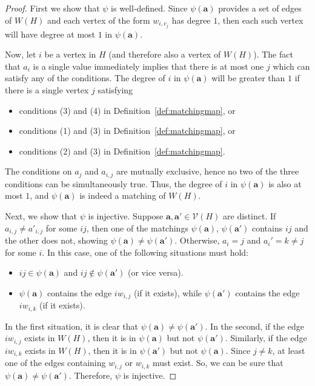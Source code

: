 \documentclass[12pt]{amsart}
\theoremstyle{definition}
\newcommand\ba{\mathbf{a}}
\newcommand\calV{\mathcal{V}}
\begin{document}
\begin{proof}
    First we show that $\psi$ is well-defined.
    Since $\psi(\ba)$ provides a set of edges of $W(H)$ and each vertex of the form $w_{i,v_j}$ has degree $1$, then each such vertex will have degree at most $1$ in $\psi(\ba)$.
    
    Now, let $i$ be a vertex in $H$ (and therefore also a vertex of $W(H)$).
    The fact that $a_i$ is a single value immediately implies that there is at most one $j$ which can satisfy any of the conditions.
    The degree of $i$ in $\psi(\ba)$ will be greater than $1$ if there is a single vertex $j$ satisfying
    \begin{itemize}
        \item conditions (3) and (4) in Definition~\ref{def:matchingmap}, or
        \item conditions (1) and (3) in Definition~\ref{def:matchingmap}, or
        \item conditions (2) and (3) in Definition~\ref{def:matchingmap}.
    \end{itemize}
    The conditions on $a_j$ and $a_{i,j}$ are mutually exclusive, hence no two of the three conditions can be simultaneously true.
    Thus, the degree of $i$ in $\psi(\ba)$ is also at most $1$, and $\psi(\ba)$ is indeed a matching of $W(H)$.

    Next, we show that $\psi$ is injective.
    Suppose $\ba, \ba' \in \calV(H)$ are distinct.
    If $a_{i,j} \neq a'_{i,j}$ for some $ij$, then one of the matchings $\psi(\ba)$, $\psi(\ba')$ contains $ij$ and the other does not, showing $\psi(\ba) \neq \psi(\ba')$.
    Otherwise, $a_i = j$ and $a_i' = k \neq j$ for some $i$.
    In this case, one of the following situations must hold:
    \begin{itemize}
        \item $ij \in \psi(\ba)$ and $ij \notin \psi(\ba')$ (or vice versa).
        \item $\psi(\ba)$ contains the edge $iw_{i,j}$ (if it exists), while $\psi(\ba')$ contains the edge  $iw_{i,k}$ (if it exists).
    \end{itemize}
    In the first situation, it is clear that $\psi(\ba) \neq \psi(\ba')$.
    In the second, if the edge $iw_{i,j}$ exists in $W(H)$, then it is in $\psi(\ba)$ but not $\psi(\ba')$.
    Similarly, if the edge $iw_{i,k}$ exists in $W(H)$, then it is in $\psi(\ba')$ but not $\psi(\ba)$.
    Since $j \neq k$, at least one of the edges containing $w_{i,j}$ or $w_{i,k}$ must exist.
    So, we can be sure that $\psi(\ba) \neq \psi(\ba')$.
    Therefore, $\psi$ is injective.


\end{proof}
\end{document}
